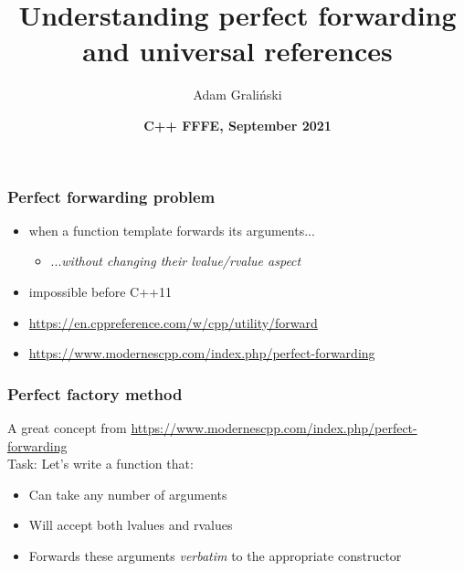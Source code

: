 \documentclass[aspectratio=169]{beamer}
\title[LTN08 :: PerfectForwarding]{Understanding perfect forwarding and universal references}
\author{Adam Graliński}
\date[FFFE\_21]{\textbf{C++ {\color{red}F}{\color{blue}F}{\color{green}F}{\color{yellow}E}, September 2021}}
\newcommand{\greenemph}[1]{\textit{\textcolor{clGreen}{#1}}}
\begin{document}
{
\begin{frame}
\titlepage{}
\end{frame}
}

\begin{frame}
\frametitle{Perfect forwarding problem}
\begin{itemize}
  \item{when a function template forwards its arguments...}
  \begin{itemize}
    \item{...\greenemph{without changing their lvalue/rvalue aspect}}
  \end{itemize}
  \item{impossible before C++11}
  \vspace{1cm}
  \item{\url{https://en.cppreference.com/w/cpp/utility/forward}}
  \item{\url{https://www.modernescpp.com/index.php/perfect-forwarding}}
\end{itemize}
\end{frame}

\begin{frame}
\frametitle{Perfect factory method}
A great concept from \url{https://www.modernescpp.com/index.php/perfect-forwarding} \\
\vspace{2em}
Task: Let's write a function that:
\begin{itemize}
  \item{Can take any number of arguments}
  \item{Will accept both lvalues and rvalues}
  \item{Forwards these arguments \greenemph{verbatim} to the appropriate constructor}
\end{itemize}
\end{frame}
\end{document}
